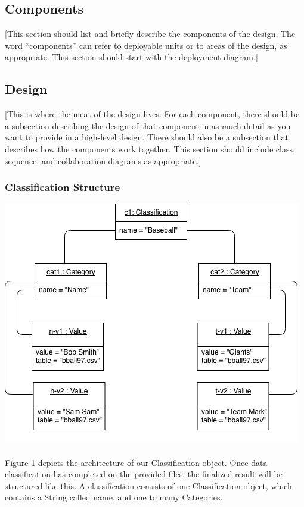 \documentclass[12pt,oneside,letterpaper]{article}
\begin{document}
\subsection{Components}
[This section should list and briefly describe the components of the design.  The word ``components'' can refer to deployable units or to areas of the design, as appropriate. This section should start with the deployment diagram.]

\subsection{Design}
[This is where the meat of the design lives.  For each component, there should be a subsection describing the design of that component in as much detail as you want to provide in a high-level design.  There should also be a subsection that describes how the components work together. This section should include class, sequence, and collaboration diagrams as appropriate.]

\subsubsection{Classification Structure}
\includegraphics[scale = 0.9]{spencer_object.png}
\begingroup
{}
\endgroup

\paragraph{} Figure 1 depicts the architecture of our Classification object. Once data classification has completed on the provided files, the finalized result will be structured like this. A classification consists of one Classification object, which contains a String called name, and one to many Categories. 
\end{document}
